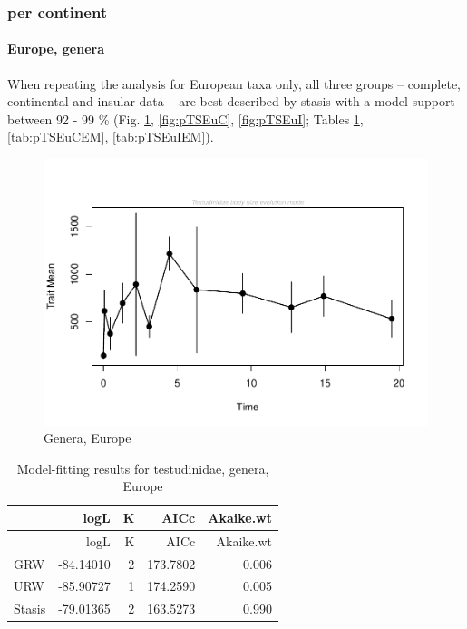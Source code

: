 \FloatBarrier

\subsubsection{per continent}\label{per-continent}

\paragraph{Europe, genera}\label{europe-genera}

When repeating the analysis for European taxa only, all three groups -- complete, continental and insular data -- are best described by stasis with a model support between 92 - 99 \% (Fig. \ref{fig:pTSEu}, \ref{fig:pTSEuC}, \ref{fig:pTSEuI}; Tables \ref{tab:pTSEuEM}, \ref{tab:pTSEuCEM}, \ref{tab:pTSEuIEM}).

\begin{figure}[H]
	\centering
	\includegraphics{MA_JJ_files/figure-latex/paleoTSEurope-1.pdf}
	\caption{Genera, Europe}
	\label{fig:pTSEu}
\end{figure}

\begin{longtable}[]{@{}lrrrr@{}}
	\caption{Model-fitting results for testudinidae, genera,
		Europe}
	\label{tab:pTSEuEM}\tabularnewline
	\toprule
	& logL & K & AICc & Akaike.wt\tabularnewline
	\midrule
	\endfirsthead
	\toprule
	& logL & K & AICc & Akaike.wt\tabularnewline
	\midrule
	\endhead
	GRW & -84.14010 & 2 & 173.7802 & 0.006\tabularnewline
	URW & -85.90727 & 1 & 174.2590 & 0.005\tabularnewline
	Stasis & -79.01365 & 2 & 163.5273 & 0.990\tabularnewline
	\bottomrule
\end{longtable}

